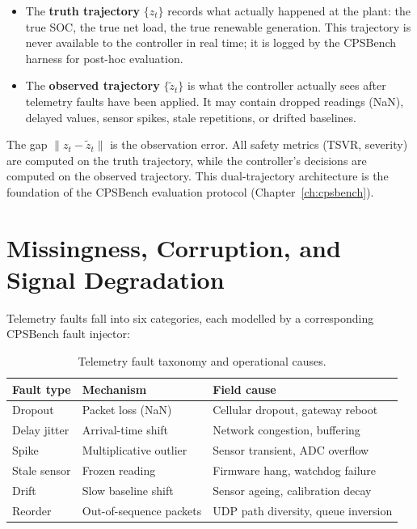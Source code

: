 \begin{itemize}
  \item The \textbf{truth trajectory} $\{z_t\}$ records what actually happened
    at the plant: the true SOC, the true net load, the true renewable
    generation.  This trajectory is never available to the controller in real
    time; it is logged by the CPSBench harness for post-hoc evaluation.
  \item The \textbf{observed trajectory} $\{\tilde{z}_t\}$ is what the
    controller actually sees after telemetry faults have been applied.  It may
    contain dropped readings (NaN), delayed values, sensor spikes, stale
    repetitions, or drifted baselines.
\end{itemize}

The gap $\|z_t - \tilde{z}_t\|$ is the observation error.  All safety metrics
(TSVR, severity) are computed on the truth trajectory, while the controller's
decisions are computed on the observed trajectory.  This dual-trajectory
architecture is the foundation of the CPSBench evaluation protocol
(Chapter~\ref{ch:cpsbench}).

\section{Missingness, Corruption, and Signal Degradation}

Telemetry faults fall into six categories, each modelled by a corresponding
CPSBench fault injector:

\begin{table}[ht]
\centering
\caption{Telemetry fault taxonomy and operational causes.}
\label{tab:fault-taxonomy}
\begin{tabular}{lll}
\toprule
\textbf{Fault type} & \textbf{Mechanism} & \textbf{Field cause} \\
\midrule
Dropout       & Packet loss (NaN)       & Cellular dropout, gateway reboot \\
Delay jitter  & Arrival-time shift      & Network congestion, buffering \\
Spike         & Multiplicative outlier  & Sensor transient, ADC overflow \\
Stale sensor  & Frozen reading          & Firmware hang, watchdog failure \\
Drift         & Slow baseline shift     & Sensor ageing, calibration decay \\
Reorder       & Out-of-sequence packets & UDP path diversity, queue inversion \\
\bottomrule
\end{tabular}
\end{table}

